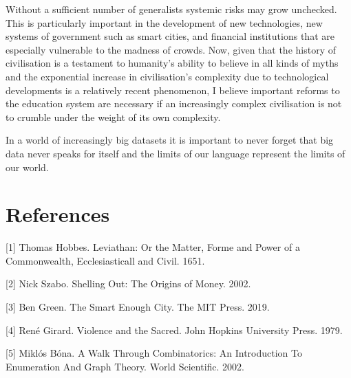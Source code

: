 \documentclass{article}
\begin{document}
Without a sufficient number of generalists systemic risks may grow unchecked. This is particularly important in the
development of new technologies, new systems of government such as smart cities, and financial
institutions that are especially vulnerable to the madness of crowds. Now, given that the history of civilisation is a testament to humanity's ability to believe in all
kinds of myths and the exponential increase in civilisation's complexity due to technological
developments is a relatively recent phenomenon, I believe important reforms to the education
system are necessary if an increasingly complex civilisation is not to crumble under the
weight of its own complexity. 

In a world of increasingly big datasets it is important to never forget that big data never speaks for itself and the limits of our language represent the limits of our world. 

\section*{References}

\small

[1] Thomas Hobbes. Leviathan: Or the Matter, Forme and Power of a Commonwealth, Ecclesiasticall and Civil. 1651.

[2] Nick Szabo. Shelling Out: The Origins of Money. 2002.

[3] Ben Green. The Smart Enough City. The MIT Press. 2019.

[4] René Girard. Violence and the Sacred. John Hopkins University Press. 1979.

[5] Miklós Bóna. A Walk Through Combinatorics: An Introduction To Enumeration And Graph Theory. World Scientific. 2002.   
\end{document}
